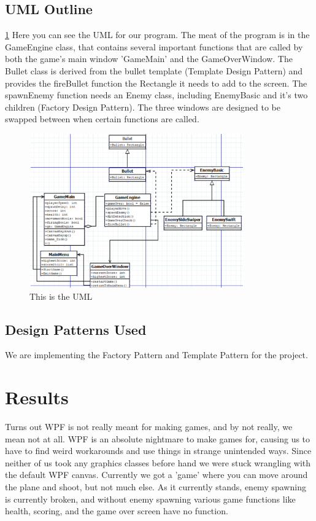 \documentclass[10pt,conference,onecolumn,compsoc]{IEEEtran}
\begin{document}
\subsection{UML Outline}
\ref {UML}
Here you can see the UML for our program. The meat of the program is in the GameEngine class, that contains several important functions that are called by both the game's main window 'GameMain' and the GameOverWindow. The Bullet class is derived from the bullet template (Template Design Pattern) and provides the fireBullet function the Rectangle it needs to add to the screen. The spawnEnemy function needs an Enemy class, including EnemyBasic and it's two children (Factory Design Pattern). The three windows are designed to be swapped between when certain functions are called.
\begin{figure}[ht!]
\includegraphics[height=250px, width=350px]{DIA.png}
\caption{This is the UML}
\label{UML}
\end{figure}

\subsection{Design Patterns Used}
We are implementing the Factory Pattern and Template Pattern for the project.


\section{Results}
Turns out WPF is not really meant for making games, and by not really, we mean not at all. WPF is an absolute nightmare to make games for, causing us to have to find weird workarounds and use things in strange unintended ways. Since neither of us took any graphics classes before hand we were stuck wrangling with the default WPF canvas. Currently we got a 'game' where you can move around the plane and shoot, but not much else. As it currently stands, enemy spawning is currently broken, and without enemy spawning various game functions like health, scoring, and the game over screen have no function.
\end{document}
